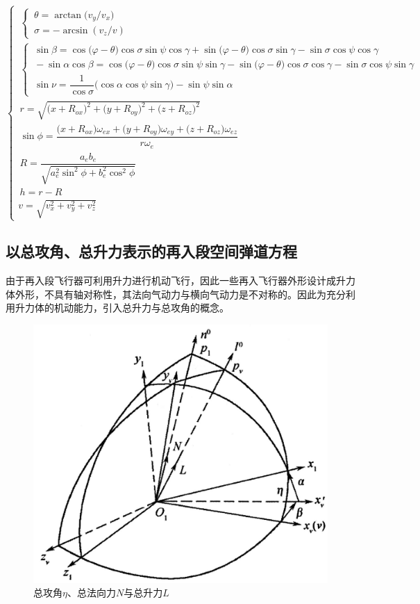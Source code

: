 \begin{equation}
\begin{cases}
	\,
	\begin{cases}
		\, \theta = \arctan \big(v_y/ v_x\big) \\
		\, \sigma = - \arcsin(v_z /v)
	\end{cases}
	\\[2em]
	
	\,
	\begin{cases}
		\, \sin \beta = \cos\big(\varphi - \theta\big)\cos \sigma \sin \psi \cos \gamma + \sin \big(\varphi - \theta\big)\cos \sigma \sin \gamma - \sin \sigma \cos \psi \cos \gamma \\
		\, -\sin \alpha \cos \beta = \cos \big(\varphi - \theta\big)\cos \sigma \sin \psi \sin \gamma - \sin\big(\varphi - \theta\big) \cos \sigma \cos \gamma - \sin \sigma \cos \psi \sin \gamma \\
		\, \sin \nu = \dfrac{1}{\cos \sigma} \big(\cos \alpha \cos \psi \sin \gamma \big) - \sin \psi \sin \alpha 
	\end{cases}
	\\[3.2em]
	
	\, r = \sqrt{\big(x + R_{ox}\big)^2 + \big(y+R_{oy}\big)^2 + \big(z + R_{oz}\big)^2}
	\\[1em]
	
	\, \sin \phi = \dfrac{\big(x + R_{ox}\big)\omega_{ex} + \big(y + R_{oy}\big)\omega_{ey} + \big(z + R_{oz}\big)\omega_{ez}}{r\omega_e}
	\\[1em]
	
	\, R = \dfrac{a_e b_e}{\sqrt{a_e^2 \sin^2 \phi + b_e^2 \cos^2 \phi}}
	\\[1em]
	
	\, h = r - R
	\\
	
	v = \sqrt{v_x^2 + v_y^2 + v_z^2}
	\end{cases}
\end{equation}

\subsection{以总攻角、总升力表示的再入段空间弹道方程}

由于再入段飞行器可利用升力进行机动飞行，因此一些再入飞行器外形设计成升力体外形，不具有轴对称性，其法向气动力与横向气动力是不对称的。因此为充分利用升力体的机动能力，引入总升力与总攻角的概念。


\begin{figure}[!htb]
	\centering
	\includegraphics[width=0.4\linewidth]{pic/总攻角.jpg}
	\caption{总攻角$\eta$、总法向力$N$与总升力$L$}
	\label{总攻角}
\end{figure}

